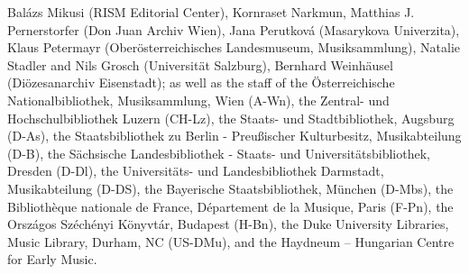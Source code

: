 \documentclass{ees}
\begin{document}
Balázs Mikusi (RISM Editorial Center),
Kornraset Narkmun,
Matthias J. Pernerstorfer (Don Juan Archiv Wien),
Jana Perutková (Masarykova Univerzita),
Klaus Petermayr (Oberösterreichisches Landesmuseum, Musiksammlung),
Natalie Stadler and Nils Grosch (Universität Salzburg),
Bernhard Weinhäusel (Diözesanarchiv Eisenstadt);
as well as the staff of
the Österreichische Nationalbibliothek, Musiksammlung, Wien (A-Wn),
the Zentral- und Hochschulbibliothek Luzern (CH-Lz),
the Staats- und Stadtbibliothek, Augsburg (D-As),
the Staatsbibliothek zu Berlin - Preußischer Kulturbesitz, Musikabteilung (D-B),
the Sächsische Landesbibliothek - Staats- und Universitätsbibliothek, Dresden (D-Dl),
the Universitäts- und Landesbibliothek Darmstadt, Musikabteilung (D-DS),
the Bayerische Staatsbibliothek, München (D-Mbs),
the Bibliothèque nationale de France, Département de la Musique, Paris (F-Pn),
the Országos Széchényi Könyvtár, Budapest (H-Bn),
the Duke University Libraries, Music Library, Durham, NC (US-DMu),
and the Haydneum – Hungarian Centre for Early Music.


\clearpage
{}
\end{document}
